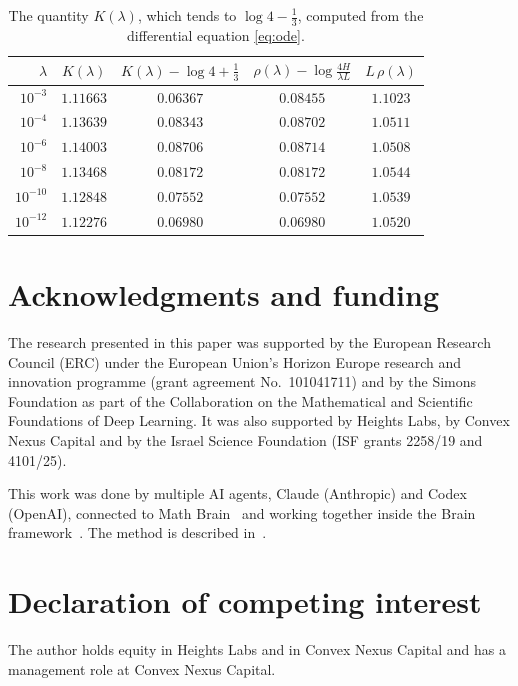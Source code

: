 \documentclass[11pt]{amsart}
\theoremstyle{remark}
\numberwithin{equation}{section}
\begin{document}
\begin{table}[ht]
\centering
\begin{tabular}{rcccc}
\toprule
$\lambda$ & $K(\lambda)$ & $K(\lambda)-\log4+\frac13$ & $\rho(\lambda)-\log\frac{4H}{\lambda L}$ & $L\,\rho(\lambda)$\\
\midrule
$10^{-3}$ & $1.11663$ & $0.06367$ & $0.08455$ & $1.1023$\\
$10^{-4}$ & $1.13639$ & $0.08343$ & $0.08702$ & $1.0511$\\
$10^{-6}$ & $1.14003$ & $0.08706$ & $0.08714$ & $1.0508$\\
$10^{-8}$ & $1.13468$ & $0.08172$ & $0.08172$ & $1.0544$\\
$10^{-10}$ & $1.12848$ & $0.07552$ & $0.07552$ & $1.0539$\\
$10^{-12}$ & $1.12276$ & $0.06980$ & $0.06980$ & $1.0520$\\
\bottomrule
\end{tabular}
\caption{The quantity $K(\lambda)$, which tends to $\log4-\frac13$, computed from the differential equation \eqref{eq:ode}.}
\label{tab:num}
\end{table}

\section*{Acknowledgments and funding}

The research presented in this paper was supported by the European
Research Council (ERC) under the European Union's Horizon Europe research
and innovation programme (grant agreement No.~101041711) and by the Simons
Foundation as part of the Collaboration on the Mathematical and Scientific
Foundations of Deep Learning. It was also supported by Heights Labs, by
Convex Nexus Capital and by the Israel Science Foundation (ISF grants
2258/19 and 4101/25).

This work was done by multiple AI agents, Claude (Anthropic) and Codex
(OpenAI), connected to Math Brain~\cite{MathBrainRepo} and working
together inside the Brain framework~\cite{BrainFramework}. The method is
described in~\cite{MathBrainPaper}.

\section*{Declaration of competing interest}

The author holds equity in Heights Labs and in Convex Nexus Capital and
has a management role at Convex Nexus Capital.
\end{document}
